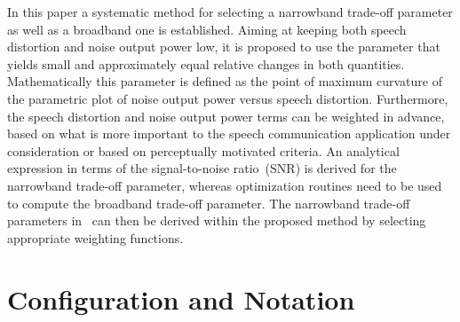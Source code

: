 \documentclass{article}
\begin{document}
In this paper a systematic method for selecting a narrowband trade-off parameter as well as a broadband one is established.
Aiming at keeping both speech distortion and noise output power low, it is proposed to use the parameter that yields small and approximately equal relative changes in both quantities.
Mathematically this parameter is defined as the point of maximum curvature of the parametric plot of noise output power versus speech distortion.
Furthermore, the speech distortion and noise output power terms can be weighted in advance, based on what is more important to the speech communication application under consideration or based on perceptually motivated criteria. 
An analytical expression in terms of the signal-to-noise ratio~(SNR) is derived for the narrowband trade-off parameter, whereas optimization routines need to be used to compute the broadband trade-off parameter.
The narrowband trade-off parameters in~\cite{Ngo_IWAENC_2008,Defraene_ICASSP_2012} can then be derived within the proposed method by selecting appropriate weighting functions.

\vspace{-0.25cm}
\section{Configuration and Notation}
\end{document}
